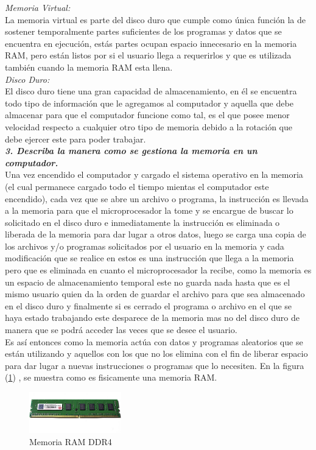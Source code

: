 \documentclass{article}
\begin{document}
\textit{Memoria Virtual:}\\ 
La memoria virtual es parte del disco duro que cumple como única función la de sostener temporalmente partes suficientes de los programas y datos que se encuentra en ejecución, estás partes ocupan espacio innecesario en la memoria RAM,  pero están listos por si el usuario llega a requerirlos y que es utilizada también cuando la memoria RAM esta llena.\\

\textit{Disco Duro:}\\ 
El disco duro tiene una gran capacidad de almacenamiento, en él se encuentra todo tipo de información que le agregamos al computador y aquella que debe almacenar para que el computador funcione como tal, es el que posee menor velocidad respecto a cualquier otro tipo de memoria debido a la rotación que debe ejercer este para poder trabajar.\\


\textbf {\textit{3. Describa la manera como se gestiona la memoria en un computador.}}\\
Una vez encendido el computador y cargado el sistema operativo en la memoria (el cual permanece cargado todo el tiempo mientas el computador este encendido), cada vez que se abre un archivo o programa, la instrucción es llevada a la memoria para que el microprocesador la tome y se encargue de buscar lo solicitado en el disco duro e inmediatamente la instrucción es eliminada o liberada de la memoria para dar lugar a otros datos, luego se carga una copia de los archivos y/o programas solicitados por el usuario en la memoria y cada modificación que se realice en  estos es una instrucción que llega a la memoria pero que es eliminada en cuanto el microprocesador la recibe, como la memoria es un espacio de almacenamiento temporal este no guarda nada hasta que es el mismo usuario quien da la orden de guardar el archivo para que sea almacenado en el disco duro y finalmente si es cerrado el programa o archivo en el que se haya estado trabajando este desparece de la memoria mas no del disco duro de manera que se podrá acceder las veces que se desee el usuario.\\
Es así entonces como la memoria actúa con datos y programas aleatorios que se están utilizando y aquellos con los que no los elimina con el fin de liberar espacio para dar lugar a nuevas instrucciones o programas que lo necesiten.
En la figura (\ref{fig:RAM.jpg}) , se muestra como es fisicamente una memoria RAM.

\begin{figure}[h]
\includegraphics[width=4cm]{RAM.jpg}
\centering
\caption{Memoria RAM DDR4\cite{RAMwebsite}}
\label{fig:RAM.jpg}
\end{figure}
\end{document}
